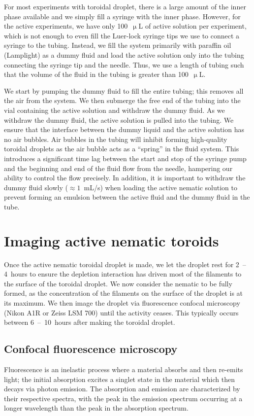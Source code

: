 For most experiments with toroidal droplet, there is a large amount of the inner phase available and we simply fill a syringe with the inner phase.
However, for the active experiments, we have only 100~$\upmu$L of active solution per experiment, which is not enough to even fill the Luer-lock syringe tips we use to connect a syringe to the tubing.
Instead, we fill the system primarily with paraffin oil (Lamplight) as a dummy fluid and load the active solution only into the tubing connecting the syringe tip and the needle.
Thus, we use a length of tubing such that the volume of the fluid in the tubing is greater than 100~$\upmu$L.

We start by pumping the dummy fluid to fill the entire tubing; this removes all the air from the system.
We then submerge the free end of the tubing into the vial containing the active solution and withdraw the dummy fluid.
As we withdraw the dummy fluid, the active solution is pulled into the tubing.
We ensure that the interface between the dummy liquid and the active solution has no air bubbles.
Air bubbles in the tubing will inhibit forming high-quality toroidal droplets as the air bubble acts as a ``spring'' in the fluid system.
This introduces a significant time lag between the start and stop of the syringe pump and the beginning and end of the fluid flow from the needle, hampering our ability to control the flow precisely.
In addition, it is important to withdraw the dummy fluid slowly ($\approx 1$~mL/s) when loading the active nematic solution to prevent forming an emulsion between the active fluid and the dummy fluid in the tube.




\section{Imaging active nematic toroids}
Once the active nematic toroidal droplet is made, we let the droplet rest for 2~--4~hours to ensure the depletion interaction has driven most of the filaments to the surface of the toroidal droplet.
We now consider the nematic to be fully formed, as the concentration of the filaments on the surface of the droplet is at its maximum.
We then image the droplet via fluorescence confocal microscopy (Nikon A1R or Zeiss LSM 700) until the activity ceases.
This typically occurs between 6~--~10~hours after making the toroidal droplet.


\subsection{Confocal fluorescence microscopy}
Fluorescence is an inelastic process where a material absorbs and then re-emits light; the initial absorption excites a singlet state in the material which then decays via photon emission.
The absorption and emission are characterized by their respective spectra, with the peak in the emission spectrum occurring at a longer wavelength than the peak in the absorption spectrum.

